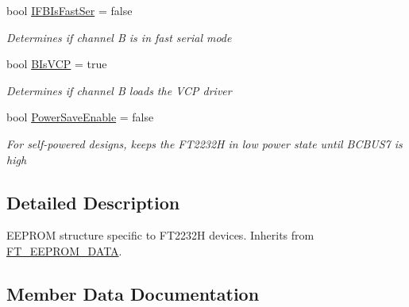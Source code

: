 \begin{DoxyCompactItemize}
bool \mbox{\hyperlink{class_f_t_d2_x_x___n_e_t_1_1_f_t_d_i_1_1_f_t2232_h___e_e_p_r_o_m___s_t_r_u_c_t_u_r_e_ae9ef86835610875b1075849567d33e6d}{I\+F\+B\+Is\+Fast\+Ser}} = false
\begin{DoxyCompactList}\small\item\em Determines if channel B is in fast serial mode \end{DoxyCompactList}\item 
bool \mbox{\hyperlink{class_f_t_d2_x_x___n_e_t_1_1_f_t_d_i_1_1_f_t2232_h___e_e_p_r_o_m___s_t_r_u_c_t_u_r_e_afb8131708cd195a9e41dbae05609b168}{B\+Is\+V\+CP}} = true
\begin{DoxyCompactList}\small\item\em Determines if channel B loads the V\+CP driver \end{DoxyCompactList}\item 
bool \mbox{\hyperlink{class_f_t_d2_x_x___n_e_t_1_1_f_t_d_i_1_1_f_t2232_h___e_e_p_r_o_m___s_t_r_u_c_t_u_r_e_a97833e7187b30d7a95cf82605b07fdad}{Power\+Save\+Enable}} = false
\begin{DoxyCompactList}\small\item\em For self-\/powered designs, keeps the F\+T2232H in low power state until B\+C\+B\+U\+S7 is high \end{DoxyCompactList}\end{DoxyCompactItemize}


\subsection{Detailed Description}
E\+E\+P\+R\+OM structure specific to F\+T2232H devices. Inherits from \mbox{\hyperlink{class_f_t_d2_x_x___n_e_t_1_1_f_t_d_i_1_1_f_t___e_e_p_r_o_m___d_a_t_a}{F\+T\+\_\+\+E\+E\+P\+R\+O\+M\+\_\+\+D\+A\+TA}}. 



\subsection{Member Data Documentation}
\mbox{\label{class_f_t_d2_x_x___n_e_t_1_1_f_t_d_i_1_1_f_t2232_h___e_e_p_r_o_m___s_t_r_u_c_t_u_r_e_ae792c46338485d31a66a6d46a5a9fb1f}} 
